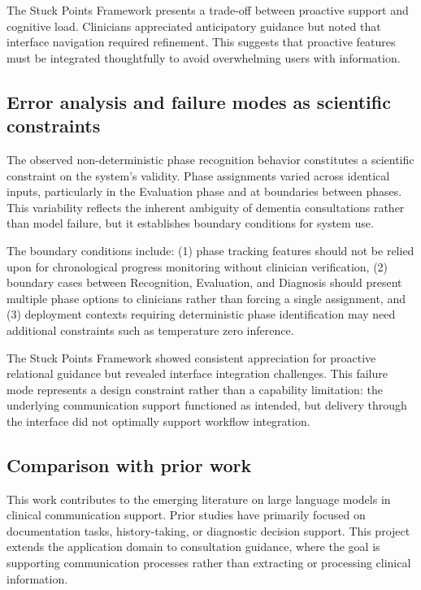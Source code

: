 The Stuck Points Framework presents a trade-off between proactive support and cognitive load. Clinicians appreciated anticipatory guidance but noted that interface navigation required refinement. This suggests that proactive features must be integrated thoughtfully to avoid overwhelming users with information.

\subsection{Error analysis and failure modes as scientific constraints}

The observed non-deterministic phase recognition behavior constitutes a scientific constraint on the system's validity. Phase assignments varied across identical inputs, particularly in the Evaluation phase and at boundaries between phases. This variability reflects the inherent ambiguity of dementia consultations rather than model failure, but it establishes boundary conditions for system use.

The boundary conditions include: (1) phase tracking features should not be relied upon for chronological progress monitoring without clinician verification, (2) boundary cases between Recognition, Evaluation, and Diagnosis should present multiple phase options to clinicians rather than forcing a single assignment, and (3) deployment contexts requiring deterministic phase identification may need additional constraints such as temperature zero inference.

The Stuck Points Framework showed consistent appreciation for proactive relational guidance but revealed interface integration challenges. This failure mode represents a design constraint rather than a capability limitation: the underlying communication support functioned as intended, but delivery through the interface did not optimally support workflow integration.

\subsection{Comparison with prior work}

This work contributes to the emerging literature on large language models in clinical communication support. Prior studies have primarily focused on documentation tasks, history-taking, or diagnostic decision support. This project extends the application domain to consultation guidance, where the goal is supporting communication processes rather than extracting or processing clinical information.

